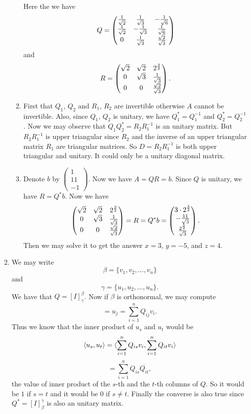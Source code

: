 \begin{enumerate}
\begin{enumerate}
Here the we have 
\[Q=\begin{pmatrix}\frac{1}{\sqrt{2}} & \frac{1}{\sqrt{3}} & -\frac{1}{\sqrt{6}}\cr \frac{1}{\sqrt{2}} & -\frac{1}{\sqrt{3}} & \frac{1}{\sqrt{6}}\cr 0 & \frac{1}{\sqrt{3}} & \frac{\sqrt{2}}{\sqrt{3}}\end{pmatrix}\]
and 
\[R=\begin{pmatrix}\sqrt{2} & \sqrt{2} & {2}^{\frac{3}{2}}\cr 0 & \sqrt{3} & \frac{1}{\sqrt{3}}\cr 0 & 0 & \frac{\sqrt{2}}{\sqrt{3}}\end{pmatrix}.\]
\item First that $Q_1$, $Q_2$ and $R_1$, $R_2$ are invertible otherwise $A$ cannot be invertible. Also, since $Q_1$, $Q_2$ is unitary, we have $Q_1^*=Q_1^{-1}$ and $Q_2^*=Q_2^{-1}$. Now we may observe that $Q_1Q_2^*=R_2R_1^{-1}$ is an unitary matrix. But $R_2R_1^{-1}$ is upper triangular since $R_2$ and the inverse of an upper triangular matrix $R_1$ are triangular matrices. So $D=R_2R_1^{-1}$ is both upper triangular and unitary. It could only be a unitary diagonal matrix.
\item Denote $b$ by $\begin{pmatrix}1\\11\\-1\end{pmatrix}$. Now we have $A=QR=b$. Since $Q$ is unitary, we have $R=Q^*b$. Now we have 
\[\begin{pmatrix}\sqrt{2} & \sqrt{2} & {2}^{\frac{3}{2}}\cr 0 & \sqrt{3} & \frac{1}{\sqrt{3}}\cr 0 & 0 & \frac{\sqrt{2}}{\sqrt{3}}\end{pmatrix}=R=Q^*b=\begin{pmatrix}3\cdot {2}^{\frac{3}{2}}\cr -\frac{11}{\sqrt{3}}\cr \frac{{2}^{\frac{5}{2}}}{\sqrt{3}}\end{pmatrix}.\]
Then we may solve it to get the answer $x=3$, $y=-5$, and $z=4$.
\end{enumerate}
\item We may write 
\[\beta=\{v_1,v_2,\ldots ,v_n\}\]
and 
\[\gamma=\{u_1,u_2,\ldots ,u_n\}.\]
We have that $Q=[I]_{\gamma}^{\beta}$. Now if $\beta $ is orthonormal, we may compute 
\[=u_j=\sum_{i=1}^n{Q_{ij}v_i}.\]
Thus we know that the inner product of $u_s$ and $u_t$ would be 
\[\langle u_s,u_t\rangle =\langle \sum_{i=1}^n{Q_{is}v_i},\sum_{i=1}^n{Q_{it}v_i}\rangle \]
\[=\sum_{i=1}^n{Q_{is}\overline{Q_{it}}},\]
the value of inner product of the $s$-th and the $t$-th columns of $Q$. So it would be $1$ if $s=t$ and it would be $0$ if $s\neq t$. Finally the converse is also true since $Q^*=[I]_{\beta}^{\gamma}$ is also an unitary matrix.

\end{enumerate}
